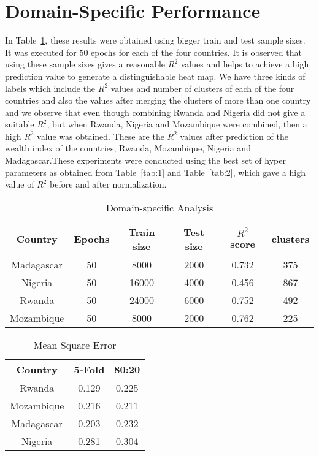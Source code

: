 \section{Domain-Specific Performance}
In {Table~\ref{tab:4}}, these results were obtained using bigger train and test sample sizes. It was executed for $50$ epochs for each of the four countries. It is observed that using these sample sizes gives a reasonable \(R^2\) values and helps to achieve a high prediction value to generate a distinguishable heat map. We have three kinds of labels which include the \(R^2\) values and number of clusters of each of the four countries and also the values after merging the clusters of more than one country and we observe that even though combining Rwanda and Nigeria did not give a suitable \(R^2\), but when Rwanda, Nigeria and Mozambique were combined, then a high \(R^2\) value was obtained. These are the \(R^2\) values after prediction of the wealth index of the countries, Rwanda, Mozambique, Nigeria and Madagascar.These experiments were conducted using the best set of hyper parameters as obtained from Table~\ref{tab:1} and Table~\ref{tab:2}, which gave a high value of \(R^2\) before and after normalization. 

\begin{table}[h!]
 \caption{Domain-specific Analysis}
 \label{tab:4} 
\begin{center}
\begin{tabular}{|c|c|c|c|c|c|}
\hline
Country & Epochs & Train size & Test size & \(R^2\) score & clusters \\
\hline\hline
Madagascar & 50 & 8000 & 2000 & 0.732 & 375 \\
Nigeria & 50 &  16000    &  4000 & 0.456 & 867 \\
Rwanda & 50 & 24000 & 6000 & 0.752 & 492 \\
Mozambique & 50 &  8000    &  2000 & 0.762 & 225\\

 
\hline \hline
\end{tabular}
\end{center}
\end{table}


\begin{table}[h!]
 \caption{Mean Square Error}
 \label{tab:9} 
\begin{center}
\begin{tabular}{|c|c|c|}
\hline
Country & 5-Fold & 80:20    \\
\hline\hline
Rwanda & 0.129 & 0.225 \\
Mozambique & 0.216 & 0.211 \\
Madagascar & 0.203 & 0.232\\
Nigeria & 0.281 & 0.304\\
\hline\hline
\end{tabular}
\end{center}
\end{table}

